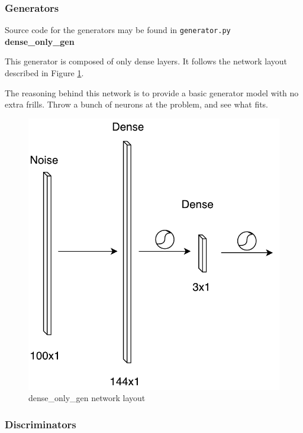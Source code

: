 \documentclass[11pt]{article}
\begin{document}
\subsubsection{Generators}

Source code for the generators may be found in \texttt{generator.py} \\

\noindent \textbf{dense\_only\_gen}

This generator is composed of only dense layers. It follows the network layout described in Figure \ref{fig:dense_only_gen}.

The reasoning behind this network is to provide a basic generator model with no extra frills. Throw a bunch of neurons at the problem, and see what fits.

\begin{figure}[ht]
    \centering
    \includegraphics[scale=0.65]{img/dense_only_gen}
    \caption{dense\_only\_gen network layout}
    \label{fig:dense_only_gen}
\end{figure}

\subsubsection{Discriminators}
\end{document}
